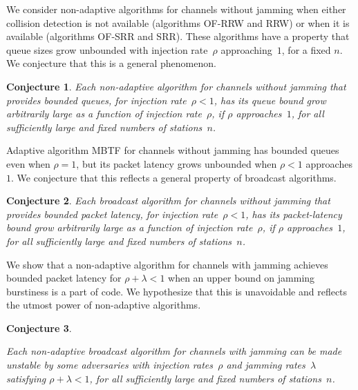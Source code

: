 \documentclass[11pt]{article}
\newtheorem{conjecture}{Conjecture}
\begin{document}
We consider non-adaptive algorithms for channels without jamming when either collision detection is not available  (algorithms \textsc{OF-RRW} and \textsc{RRW}) or when it is available (algorithms \textsc{OF-SRR} and \textsc{SRR}).
These algorithms have a property that queue sizes grow unbounded with injection rate~$\rho$ approaching~$1$, for a fixed $n$.
We conjecture that this is a general phenomenon.


\begin{conjecture}
Each non-adaptive algorithm for channels without jamming that provides bounded queues, for injection rate~$\rho<1$, has its queue bound grow arbitrarily large as a function of injection rate~$\rho$, if $\rho$  approaches~$1$, for all sufficiently large and fixed numbers of stations~$n$.
\end{conjecture}



Adaptive algorithm \textsc{MBTF} for channels without jamming has bounded queues even when $\rho=1$, but its packet latency grows unbounded when $\rho<1$ approaches $1$.
We conjecture that this reflects a general property of broadcast algorithms.


\begin{conjecture}
Each broadcast algorithm for channels without jamming that provides bounded packet latency, for injection rate~$\rho<1$, has its packet-latency bound grow arbitrarily large as a function of injection rate~$\rho$, if $\rho$  approaches~$1$, for all sufficiently large and fixed numbers of stations~$n$.
\end{conjecture}



We show that a non-adaptive algorithm for channels with jamming achieves bounded packet latency for $\rho+\lambda<1$ when an upper bound on jamming burstiness is a part of code.
We hypothesize that this is unavoidable and reflects the utmost power of non-adaptive algorithms.




\begin{conjecture}
\label{hyp:fulls-sensing}

Each non-adaptive broadcast algorithm for channels with jamming  can be made unstable by some  adversaries with injection rates~$\rho$ and jamming rates~$\lambda$ satisfying $\rho + \lambda < 1$, for all sufficiently large  and fixed numbers of stations~$n$.
\end{conjecture}
\end{document}
